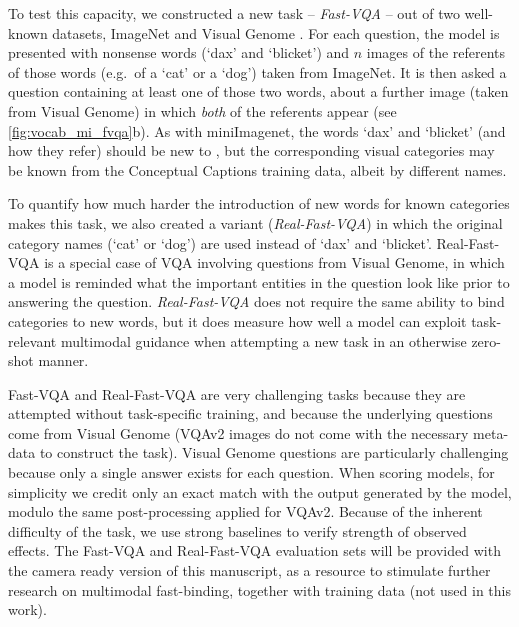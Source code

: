 To test this capacity, we constructed a new task -- \emph{Fast-VQA} -- out of two well-known datasets, ImageNet \cite{russakovsky2015imagenet} and Visual Genome \cite{krishna2017visual}. For each question, the model is presented with nonsense words (`dax' and `blicket') and $n$ images of the referents of those words (e.g.\ of a `cat' or a `dog') taken from ImageNet. It is then asked a question containing at least one of those two words, about a further image (taken from Visual Genome) in which \emph{both} of the referents appear (see \autoref{fig:vocab_mi_fvqa}b). As with miniImagenet, the words `dax' and `blicket' (and how they refer) should be new to \Model, but the corresponding visual categories may be known from the Conceptual Captions training data, albeit by different names.

To quantify how much harder the introduction of new words for known categories makes this task, we also created a variant (\emph{Real-Fast-VQA}) in which the original category names (`cat' or `dog') are used instead of `dax' and `blicket'. Real-Fast-VQA is a special case of VQA involving questions from Visual Genome, in which a model is reminded what the important entities in the question look like prior to answering the question. \emph{Real-Fast-VQA} does not require the same ability to bind categories to new words, but it does measure how well a model can exploit task-relevant multimodal guidance when attempting a new task in an otherwise zero-shot manner.

Fast-VQA and Real-Fast-VQA are very challenging tasks because they are attempted without task-specific training, and because the underlying questions come from Visual Genome (VQAv2 images do not come with the necessary meta-data to construct the task). Visual Genome questions are particularly challenging because only a single answer exists for each question. When scoring models, for simplicity we credit only an exact match with the output generated by the model, modulo the same post-processing applied for VQAv2. Because of the inherent difficulty of the task, we use strong baselines to verify strength of observed effects. The Fast-VQA and Real-Fast-VQA evaluation sets will be provided with the camera ready version of this manuscript, as a resource to stimulate further research on multimodal fast-binding, together with training data (not used in this work).


